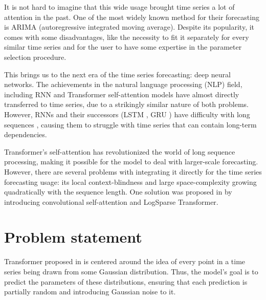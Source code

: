 \documentclass[en]{pracamgr}
\begin{document}
It is not hard to imagine that this wide usage brought time series a lot of attention in the past. One of the most widely known method for their forecasting is ARIMA (autoregressive integrated moving average). Despite its popularity, it comes with some disadvantages, like the necessity to fit it separately for every similar time series and for the user to have some expertise in the parameter selection procedure.

This brings us to the next era of the time series forecasting: deep neural networks.
The achievements in the natural language processing (NLP) field, including RNN and Transformer self-attention models have almost directly transferred to time series, due to a strikingly similar nature of both problems. However, RNNs and their successors (LSTM \cite{lstm}, GRU \cite{gru}) have difficulty with long sequences \cite{context}, causing them to struggle with time series that can contain long-term dependencies.


Transformer's self-attention \cite{tr} has revolutionized the world of long sequence processing, making it possible for the model to deal with larger-scale forecasting. However, there are several problems with integrating it directly for the time series forecasting usage: its local context-blindness \cite{enhancing} and large space-complexity growing quadratically with the sequence length.
One solution was proposed in \cite{enhancing} by introducing convolutional self-attention and LogSparse Transformer.





%

\section{Problem statement}\label{r:problemst}

Transformer proposed in \cite{enhancing} is centered around the idea of every point in a time series being drawn from some Gaussian distribution. Thus, the model's goal is to predict the parameters of these distributions, ensuring that each prediction is partially random and introducing Gaussian noise to it.
\end{document}
